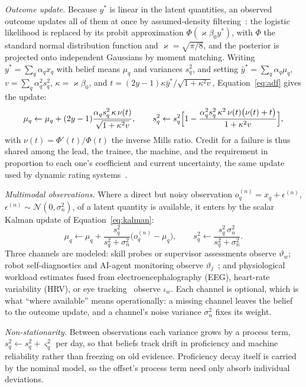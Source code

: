 \documentclass[utf8]{FrontiersinHarvard}
\begin{document}
	\textit{Outcome update.} Because $y^{\ast}$ is linear in the latent quantities, an observed outcome updates all of them at once by assumed-density filtering~\citep{Minka2001}: the logistic likelihood is replaced by its probit approximation $\Phi(\varkappa\beta_0 y^{\ast})$, with $\Phi$ the standard normal distribution function and $\varkappa=\sqrt{\pi/8}$, and the posterior is projected onto independent Gaussians by moment matching. Writing $y^{\ast}=\sum_q \alpha_q x_q$ with belief means $\mu_q$ and variances $s_q^2$, and setting $\bar y^{\ast}=\sum_q\alpha_q\mu_q$, $v=\sum_q\alpha_q^2 s_q^2$, $\kappa=\varkappa\beta_0$, and $t=(2y-1)\kappa\bar y^{\ast}/\sqrt{1+\kappa^2 v}$, Equation~\eqref{eq:adf} gives the update:
	\begin{equation}
		\mu_q \leftarrow \mu_q + (2y-1)\frac{\alpha_q s_q^2\,\kappa\,\nu(t)}{\sqrt{1+\kappa^2 v}},\qquad
		s_q^2 \leftarrow s_q^2\Bigl[1 - \frac{\alpha_q^2 s_q^2\,\kappa^2\,\nu(t)\bigl(\nu(t)+t\bigr)}{1+\kappa^2 v}\Bigr],
		\label{eq:adf}
	\end{equation}
	with $\nu(t)=\Phi'(t)/\Phi(t)$ the inverse Mills ratio. Credit for a failure is thus shared among the lead, the trainee, the machine, and the requirement in proportion to each one's coefficient and current uncertainty, the same update used by dynamic rating systems~\citep{Glickman1999}.

	\textit{Multimodal observations.} Where a direct but noisy observation $o^{(n)}_q = x_q + \epsilon^{(n)}$, $\epsilon^{(n)}\sim\mathcal{N}(0,\sigma_n^2)$, of a latent quantity is available, it enters by the scalar Kalman update of Equation~\eqref{eq:kalman}:
	\begin{equation}
		\mu_q \leftarrow \mu_q + \frac{s_q^2}{s_q^2+\sigma_n^2}\bigl(o^{(n)}_q-\mu_q\bigr),\qquad
		s_q^2 \leftarrow \frac{s_q^2\,\sigma_n^2}{s_q^2+\sigma_n^2}.
		\label{eq:kalman}
	\end{equation}
	Three channels are modeled: skill probes or supervisor assessments observe $\vartheta_w$; robot self-diagnostics and AI-agent monitoring observe $\vartheta_j$~\citep{Norton2022}; and physiological workload estimates fused from electroencephalography (EEG), heart-rate variability (HRV), or eye tracking~\citep{Debie2021,Dehais2020} observe $\iota_w$. Each channel is optional, which is what ``where available'' means operationally: a missing channel leaves the belief to the outcome update, and a channel's noise variance $\sigma_n^2$ fixes its weight.

	\textit{Non-stationarity.} Between observations each variance grows by a process term, $s_q^2\leftarrow s_q^2+\varsigma_q^2$ per day, so that beliefs track drift in proficiency and machine reliability rather than freezing on old evidence. Proficiency decay itself is carried by the nominal model, so the offset's process term need only absorb individual deviations.
\end{document}
